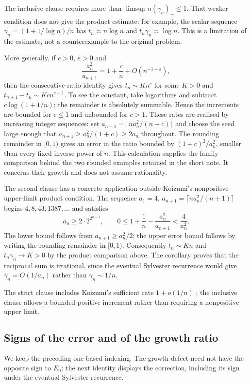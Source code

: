 The inclusive clause requires more than $\limsup n(\gamma_n)_+\le1$.
That weaker condition does not give the product estimate: for example,
the scalar sequence $\gamma_n=(1+1/\log n)/n$ has $t_n\asymp n\log n$
and $t_n\gamma_n\asymp\log n$. This is a limitation of the estimate, not a
counterexample to the original problem.

More generally, if $c>0$, $\varepsilon>0$ and
\[
 \frac{a_n^2}{a_{n+1}}=1+\frac cn+O(n^{-1-\varepsilon}),
\]
then the consecutive-ratio identity gives $t_n\sim Kn^c$ for some
$K>0$ and $t_{n+1}-t_n\sim Kc n^{c-1}$. To see the constant, take
logarithms and subtract $c\log(1+1/n)$; the remainder is absolutely summable.
Hence the increments are bounded for $c\le1$ and unbounded for $c>1$.
These rates are realised by increasing integer sequences: set
$a_{n+1}=\lceil n a_n^2/(n+c)\rceil$ and choose the seed large enough
that $a_{n+1}\ge a_n^2/(1+c)\ge2a_n$ throughout. The rounding remainder
in $[0,1)$ gives an error in the ratio bounded by
$(1+c)^2/a_n^2$, smaller than every fixed inverse power of $n$.
This calculation supplies the family comparison behind the two rounded
examples retained in the short note. It concerns their growth and does
not assume rationality.

The second clause has a concrete application outside Koizumi's
nonpositive-upper-limit product condition. The sequence
$a_1=4$, $a_{n+1}=\lceil n a_n^2/(n+1)\rceil$ begins
$4,8,43,1387,\ldots$ and satisfies
\[
 a_n\ge2\cdot2^{2^{n-1}},\qquad
 0\le1+\frac1n-\frac{a_n^2}{a_{n+1}}<\frac4{a_n^2}.
\]
The lower bound follows from $a_{n+1}\ge a_n^2/2$; the upper error bound
follows by writing the rounding remainder in $[0,1)$.
Consequently $t_n\sim Kn$ and $t_n\gamma_n\to K>0$ by the product
comparison above. The corollary proves that the reciprocal sum is
irrational, since the eventual Sylvester recurrence would give
$\gamma_n=O(1/a_n)$ rather than $\gamma_n\sim1/n$.

The strict clause includes Koizumi's sufficient
rate $1+o(1/n)$ \cite[Remark~3, p.~16]{koizumi2025}; the inclusive clause
allows a bounded positive increment rather than requiring a nonpositive
upper limit.

\subsection{Signs of the error and of the growth ratio}

We keep the preceding one-based indexing. The growth defect need not
have the opposite sign to $E_n$: the next identity displays the
correction, including its sign under the eventual Sylvester recurrence.

